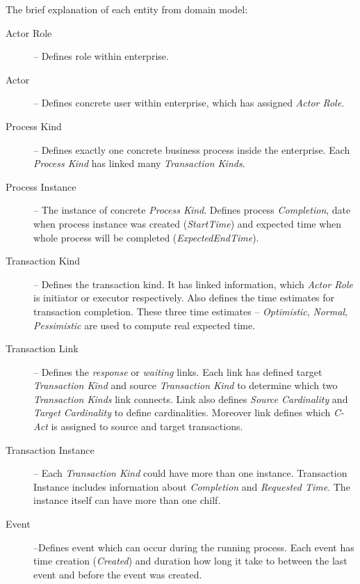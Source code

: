 The brief explanation of each entity from domain model:
\begin{description}
\item[Actor Role] -- Defines role within enterprise. 
\item[Actor] -- Defines concrete user within enterprise, which has assigned \textit{Actor Role}.

\item[Process Kind] -- Defines exactly one concrete business process inside the enterprise. Each \textit{Process Kind} has linked many \textit{Transaction Kinds}.

\item[Process Instance] -- The instance of concrete \textit{Process Kind}. Defines process \textit{Completion}, date when process instance was created (\textit{StartTime}) and expected time when whole process will be completed (\textit{ExpectedEndTime}).

\item[Transaction Kind] -- Defines the transaction kind. It has linked information, which \textit{Actor Role} is initiator or executor respectively. Also defines the time estimates for transaction completion. These three time estimates -- \textit{Optimistic}, \textit{Normal}, \textit{Pessimistic} are used to compute real expected time. 

\item[Transaction Link] -- Defines the \textit{response} or \textit{waiting} links. Each link has defined target \textit{Transaction Kind} and source \textit{Transaction Kind} to determine which two \textit{Transaction Kinds} link connects. Link also defines \textit{Source Cardinality} and \textit{Target Cardinality} to define cardinalities. Moreover link defines which \textit{C-Act} is assigned to source and target transactions.  

\item[Transaction Instance] -- Each \textit{Transaction Kind} could have more than one instance. Transaction Instance includes information about \textit{Completion} and \textit{Requested Time}. The instance itself can have more than one chilf. 

\item[Event] --Defines event which can occur during the running process. Each event has time creation (\textit{Created}) and duration how long it take to between the last event and before the event was created.

\end{description}

